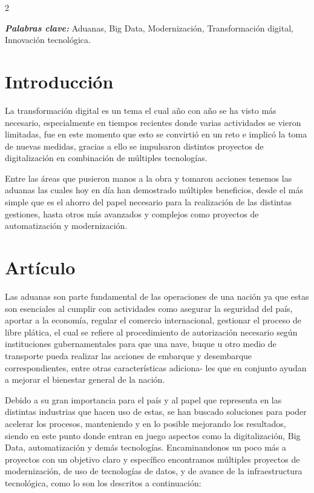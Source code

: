 \documentclass[12pt,spanish,Letterpaper,openany]{book}
\begin{document}
\begin {multicols}{2}

\textbf{\emph{Palabras clave:}} Aduanas, Big Data, Modernización, Transformación digital, Innovación tecnológica.

\hypertarget{introducciuxf3n-10}{%
\section{Introducción}\label{introducciuxf3n-10}}

La transformación digital es un tema el cual año con año se ha visto más necesario, especialmente en tiempos recientes donde varias actividades se vieron limitadas, fue en este momento que esto se convirtió en un reto e implicó la toma de nuevas medidas, gracias a ello se impulsaron distintos proyectos de digitalización en combinación de múltiples tecnologías.

Entre las áreas que pusieron manos a la obra y tomaron acciones tenemos las aduanas las cuales hoy en día han demostrado múltiples beneficios, desde el más simple que es el ahorro del papel necesario para la realización de las distintas gestiones, hasta otros más avanzados y complejos como proyectos de automatización y modernización.

\hypertarget{artuxedculo-10}{%
\section{Artículo}\label{artuxedculo-10}}

Las aduanas son parte fundamental de las operaciones de una nación ya que estas son esenciales al cumplir con actividades como asegurar la seguridad del país, aportar a la economía, regular el comercio internacional, gestionar el proceso de libre plática, el cual se refiere al procedimiento de autorización necesario según instituciones gubernamentales para que una nave, buque u otro medio de transporte pueda realizar las acciones de embarque y
desembarque correspondientes, entre otras características adiciona-
les que en conjunto ayudan a mejorar el bienestar general de la nación.

Debido a su gran importancia para el país y al papel que representa en las distintas industrias que hacen uso de estas, se han buscado soluciones para poder acelerar los procesos, manteniendo y en lo posible mejorando los resultados, siendo en este punto donde entran en juego aspectos como la digitalización, Big Data, automatización y demás tecnologías. Encaminandonos un poco más a proyectos con un objetivo claro y específico encontramos múltiples proyectos de modernización, de uso de tecnologías de datos, y de avance de la infraestructura tecnológica, como lo son los descritos a continuación:


\end{multicols}
\end{document}
